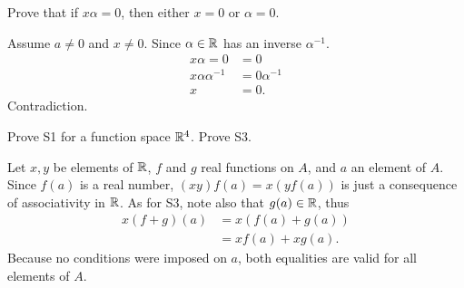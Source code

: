 \documentclass[../../main.tex]{subfiles}
\begin{document}
\begin{problem}
	Prove that if $x\alpha = 0$, then either $x=0$ or $\alpha=0$.
\end{problem}
\begin{solution}
	Assume $a \neq 0$ and $x \neq 0$. Since $\alpha \in \mathbb{R}$ has an inverse $\alpha^{-1}$.
	\begin{align*}
		x\alpha = 0 &= 0 \\
		x\alpha \alpha^{-1} &= 0 \alpha^{-1} \\
		x &= 0.
	\end{align*}
	Contradiction.
\end{solution}
\begin{problem}
	Prove S1 for a function space $\mathbb{R}^4$. Prove S3.
\end{problem}
\begin{solution}
	Let $x,y$ be elements of $\mathbb{R}$, $f$ and $g$ real functions on $A$, and $a$ an element of $A$. \\
	Since $f(a)$ is a real number, $(xy)f(a) = x(yf(a))$ is just a consequence of associativity in $\mathbb{R}$. As for S3, note also that $g(a) \in \mathbb{R}$, thus
	\begin{align*}
		x(f + g)(a) &= x(f(a) + g(a)) \\
		&= xf(a) + xg(a).
	\end{align*}
Because no conditions were imposed on $a$, both equalities are valid for all elements of $A$.
\end{solution}
\end{document}
